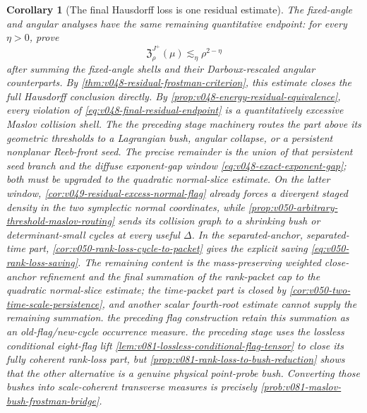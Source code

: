 \documentclass[10pt]{article}
\newtheorem{corollary}[theorem]{Corollary}
\begin{document}
\begin{corollary}[The final Hausdorff loss is one residual estimate]
\label{cor:v048-final-residual-endpoint}
The fixed-angle and angular analyses have the same remaining quantitative endpoint: for every
\(\eta>0\), prove
\begin{equation}
\label{eq:v048-final-residual-endpoint}
\mathfrak Z_\rho^{J^+}(\mu)
\lesssim_\eta
\rho^{2-\eta}
\end{equation}
after summing the fixed-angle shells and their Darboux-rescaled angular counterparts.  By
\cref{thm:v048-residual-frostman-criterion}, this estimate closes the full Hausdorff conclusion
directly.  By \cref{prop:v048-energy-residual-equivalence}, every violation of
\eqref{eq:v048-final-residual-endpoint} is a quantitatively excessive Maslov collision shell.  The
the preceding stage machinery routes the part above its geometric thresholds to a Lagrangian bush, angular
collapse, or a persistent nonplanar Reeb-front seed.  The precise remainder is the union
of that persistent seed branch and the diffuse exponent-gap window
\eqref{eq:v048-exact-exponent-gap}; both must be upgraded to the quadratic normal-slice estimate.
On the latter window, \cref{cor:v049-residual-excess-normal-flag} already forces a divergent staged
density in the two symplectic normal coordinates, while
\cref{prop:v050-arbitrary-threshold-maslov-routing} sends its collision graph to a shrinking bush or
determinant-small cycles at every useful \(\Delta\).  In the separated-anchor, separated-time part,
\cref{cor:v050-rank-loss-cycle-to-packet} gives the explicit saving
\eqref{eq:v050-rank-loss-saving}.  The remaining content is the mass-preserving weighted
close-anchor refinement and the final summation of the rank-packet cap to the quadratic normal-slice
estimate; the time-packet part is closed by
\cref{cor:v050-two-time-scale-persistence}, and another scalar fourth-root estimate cannot supply
the remaining summation.  the preceding flag construction retain this summation as an
old-flag/new-cycle occurrence measure.  the preceding stage uses the lossless conditional eight-flag lift
\cref{lem:v081-lossless-conditional-flag-tensor} to close its fully coherent rank-loss part, but
\cref{prop:v081-rank-loss-to-bush-reduction} shows that the other alternative is a genuine physical
point-probe bush.  Converting those bushes into scale-coherent transverse measures is precisely
\cref{prob:v081-maslov-bush-frostman-bridge}.
\end{corollary}
\end{document}
